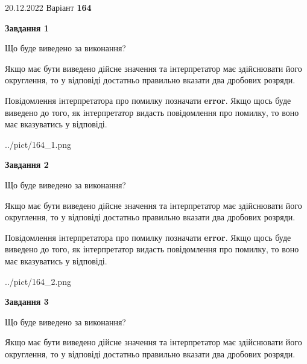 \documentclass[12pt, ukrainian]{article}
\begin{document}
{20.12.2022 Варіант \No \textbf { 164 }\par}
{
\begin {Large}

{\begin {center}\textbf{Завдання 1}\end {center}}\par
Що буде виведено за виконання? \par

Якщо має бути виведено дійсне значення та інтерпретатор має здійснювати його округлення, 
то у відповіді достатньо правильно вказати два дробових розряди.

Повідомлення інтерпретатора про помилку позначати \textbf{error}.
Якщо щось буде виведено до того, як інтерпретатор видасть повідомлення про помилку, 
то воно має вказуватись у відповіді. \par

\begin{center}
	{../pict/164_1.png}
\end{center}
\newpage

{\begin {center}\textbf{Завдання 2}\end {center}}\par
Що буде виведено за виконання? \par

Якщо має бути виведено дійсне значення та інтерпретатор має здійснювати його округлення, 
то у відповіді достатньо правильно вказати два дробових розряди.

Повідомлення інтерпретатора про помилку позначати \textbf{error}.
Якщо щось буде виведено до того, як інтерпретатор видасть повідомлення про помилку, 
то воно має вказуватись у відповіді. \par

\begin{center}
	{../pict/164_2.png}
\end{center}
\newpage

{\begin {center}\textbf{Завдання 3}\end {center}}\par
Що буде виведено за виконання? \par

Якщо має бути виведено дійсне значення та інтерпретатор має здійснювати його округлення, 
то у відповіді достатньо правильно вказати два дробових розряди.


\end{Large}}
\end{document}
